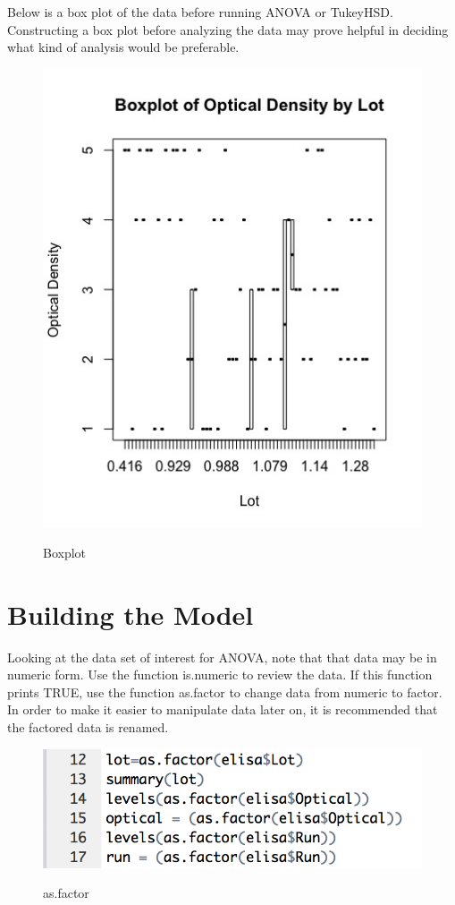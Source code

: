 \documentclass[11pt]{article}
\begin{document}
Below is a box plot of the data before running ANOVA or TukeyHSD. Constructing a box plot before analyzing the data may prove helpful in deciding what kind of analysis would be preferable.

\begin{figure}[H] %
   \centering
      \caption{Boxplot}
   \includegraphics[scale=0.5]{BoxPlotOpticalDensity.jpg} 
   \label{fig:BoxPlotOpticalDensity}
\end{figure}

 

\section{Building the Model}

Looking at the data set of interest for ANOVA, note that that data may be in numeric form. Use the function is.numeric to review the data. If this function prints TRUE, use the function as.factor to change data from numeric to factor. In order to make it easier to manipulate data later on, it is recommended that the factored data is renamed. 
\begin{figure}[H] %
   \centering
      \caption{as.factor}
   \includegraphics[scale=0.5]{asFactor.png} 
   \label{fig:as.factor}
\end{figure}
\end{document}
